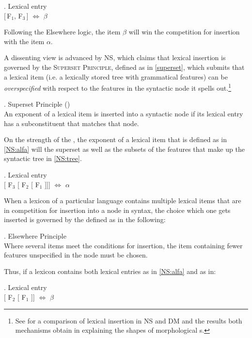 \ex. Lexical entry\\[0.5ex]
[\,F$_{1}$, F$_{3}$\,] $\Leftrightarrow$ $\beta$

Following the Elsewhere logic, the item $\beta$ will win the competition for insertion with the item 
$\alpha$.
\par
A dissenting view is advanced by NS,  which claims that lexical insertion is governed by the \textsc{Superset Principle},  defined as in \ref{superset}, which submits that a lexical item (i.e. a lexically stored tree with grammatical features) can be \textit{overspecified} with respect to the features in the syntactic node it spells out.\footnote{See \cite{Caha2018} for a comparison of lexical insertion in NS and DM  and the results both mechanisms obtain in explaining the shapes of morphological s. 
} %

\ex. Superset Principle (\citealt{Starke2009})\label{superset}\\[0.5ex]
An exponent of a lexical item is inserted into a syntactic node if its lexical entry has a subconstituent that matches that node. 

On the strength of the , the exponent of a lexical item that is defined as in \ref{NS:alfa} will  the superset as well as the subsets of the features that make up the syntactic tree in \ref{NS:tree}.

\ex.\label{NS:alfa}  Lexical entry\\[0.5ex]
[ F$_{3}$ [ F$_{2}$ [ F$_{1}$ ]]] $\Leftrightarrow$ $\alpha$ 

When a lexicon of a particular language contains multiple lexical items that are in competition for insertion into a node in syntax, the choice which one gets inserted is governed by the  defined as in the following:

\ex.  Elsewhere Principle\label{NS:elsewhere}\\
Where several items meet the conditions for insertion, the item containing fewer features unspecified in the node must be chosen.

\pagebreak Thus, if a lexicon contains both lexical entries as in \ref{NS:alfa} and as in:

\ex.\label{NS:beta} Lexical entry\\[0.5ex]
[ F$_{2}$ [ F$_{1}$ ]] $\Leftrightarrow$ $\beta$

